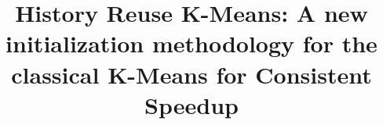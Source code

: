 \documentclass{vldb}
\begin{document}

\title{History Reuse K-Means: A new initialization methodology for the classical K-Means for Consistent Speedup}



%
%
%
%

\end{document}
